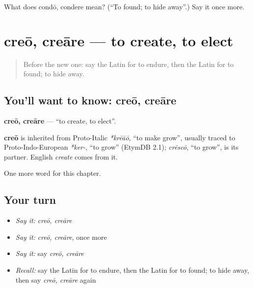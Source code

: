 \begin{tcolorbox}[breakable,colback=teal!4,colframe=teal!35!black,title={Before you move on}]
What does condō, condere mean? (\textquotedblleft{}To found; to hide away\textquotedblright{}.) Say it once more.
\end{tcolorbox}
\section[creō, creāre]{creō, creāre — to create, to elect}

\label{lesson:LA-C171-creo}



\begin{quote}
Before the new one: say the Latin for to endure, then the Latin for to found; to hide away.
\end{quote}

\subsection*{You'll want to know: creō, creāre}
\textbf{creō, creāre} — \textquotedblleft{}to create, to elect\textquotedblright{}.

\begin{cousinweb}
\textbf{creō} is inherited from Proto-Italic \emph{*krēāō}, \textquotedblleft{}to make grow\textquotedblright{}, usually traced to Proto-Indo-European \emph{*ker-}, \textquotedblleft{}to grow\textquotedblright{} (EtymDB 2.1); \emph{crēscō}, \textquotedblleft{}to grow\textquotedblright{}, is its partner. English \emph{create} comes from it.
\end{cousinweb}

\begin{grammarlens}[title={What you've built}]
One more word for this chapter.
\end{grammarlens}

\subsection*{Your turn}
\begin{itemize}
\raggedright
  \item \emph{Say it:} \emph{creō, creāre}
  \item \emph{Say it:} \emph{creō, creāre}, once more
  \item \emph{Say it:} say \emph{creō, creāre}
  \item \emph{Recall:} say the Latin for to endure, then the Latin for to found; to hide away, then say \emph{creō, creāre} again
\end{itemize}

